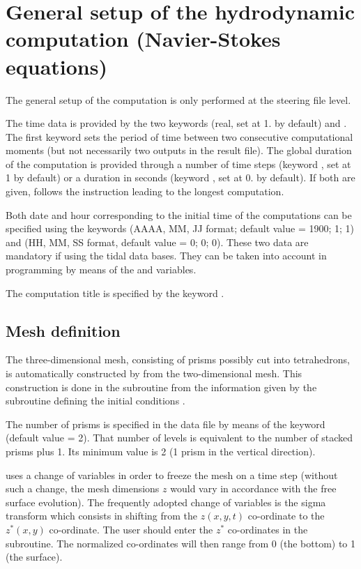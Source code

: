 \chapter{General setup of the hydrodynamic computation (Navier-Stokes equations)}

The general setup of the computation is only performed at the steering file
level.

The time data is provided by the two keywords  (real, set at
1. by default) and . The first keyword sets the
period of time between two consecutive computational moments (but not
necessarily two outputs in the result file). The global duration of the
computation is provided through a number of time steps (keyword , set at 1 by default) or a duration in seconds (keyword
, set at 0. by default). If both are given,  follows
the instruction leading to the longest computation.

Both date and hour corresponding to the initial time of the computations can be
specified using the keywords 
(AAAA, MM, JJ format; default value = 1900; 1; 1) and  (HH, MM, SS format, default value = 0; 0; 0).
These two data are mandatory if using the tidal data bases.
They can be taken into account in programming by means of the 
and  variables.

The computation title is specified by the keyword .


\section{Mesh definition}

The three-dimensional mesh, consisting of prisms possibly cut into
tetrahedrons, is automatically constructed by  from the
two-dimensional mesh. This construction is done in the subroutine
 from the information given by the subroutine defining the
initial conditions .

The number of prisms is specified in the data file by means of the keyword
 (default value = 2). That number of levels
is equivalent to the number of stacked prisms plus 1. Its minimum value is 2 (1
prism in the vertical direction).

 uses a change of variables in order to freeze the mesh on a time
step (without such a change, the mesh dimensions $z$ would vary in
accordance with the free surface evolution). The frequently adopted change of
variables is the sigma transform which consists in shifting from the $z(x,y,t)$
co-ordinate to the $z^{*} (x,y)$ co-ordinate.
The user should enter the $z^{*}$ co-ordinates in the  subroutine.
The normalized co-ordinates will then range from 0 (the bottom) to 1 (the surface).

